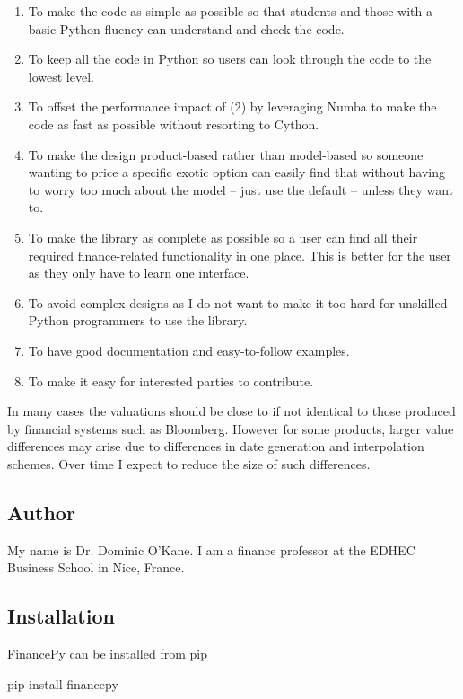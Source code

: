 \documentclass[twoside,11pt]{book}
\begin{document}
\begin{enumerate}
\item{ To make the code as simple as possible so that students and those with a basic Python fluency can understand and check the code.
}
\item{ To keep all the code in Python so users can look through the code to the lowest level.
}
\item{ To offset the performance impact of (2) by leveraging Numba to make the code as fast as possible without resorting to Cython.
}
\item{ To make the design product-based rather than model-based so someone wanting to price a specific exotic option can easily find that without having to worry too much about the model – just use the default – unless they want to.
}
\item{ To make the library as complete as possible so a user can find all their required finance-related functionality in one place. This is better for the user as they only have to learn one interface.
}
\item{ To avoid complex designs as I do not want to make it too hard for unskilled Python programmers to use the library.
}
\item{ To have good documentation and easy-to-follow examples.
}
\item{ To make it easy for interested parties to contribute.
}
\end{enumerate}

In many cases the valuations should be close to if not identical to those produced by financial systems such as Bloomberg. However for some products, larger value differences may arise due to differences in date generation and interpolation schemes. Over time I expect to reduce the size of such differences.


\subsection*{Author}

My name is Dr. Dominic O'Kane. I am a finance professor at the EDHEC Business School in Nice, France.


\subsection*{Installation}

FinancePy can be installed from pip

pip install financepy
\end{document}
